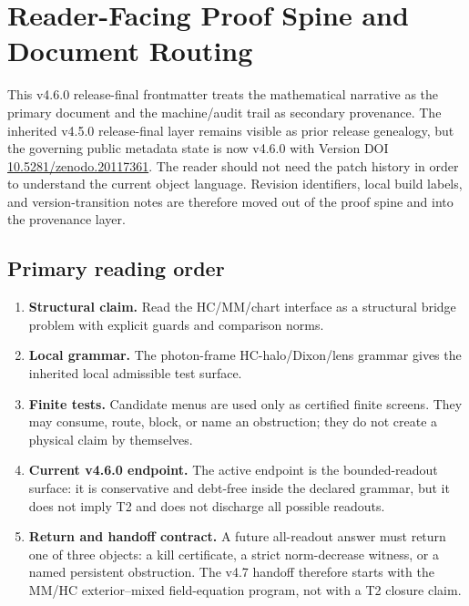 \clearpage
\section*{Reader-Facing Proof Spine and Document Routing}

This v4.6.0 release-final frontmatter treats the mathematical narrative as the primary document and the machine/audit trail as secondary provenance.  The inherited v4.5.0 release-final layer remains visible as prior release genealogy, but the governing public metadata state is now v4.6.0 with Version DOI \href{https://doi.org/10.5281/zenodo.20117361}{10.5281/zenodo.20117361}.  The reader should not need the patch history in order to understand the current object language.  Revision identifiers, local build labels, and version-transition notes are therefore moved out of the proof spine and into the provenance layer.

\subsection*{Primary reading order}

\begin{enumerate}[label=\arabic*.]
    \item \textbf{Structural claim.}  Read the HC/MM/chart interface as a structural bridge problem with explicit guards and comparison norms.
    \item \textbf{Local grammar.}  The photon-frame HC-halo/Dixon/lens grammar gives the inherited local admissible test surface.
    \item \textbf{Finite tests.}  Candidate menus are used only as certified finite screens.  They may consume, route, block, or name an obstruction; they do not create a physical claim by themselves.
    \item \textbf{Current v4.6.0 endpoint.}  The active endpoint is the bounded-readout surface: it is conservative and debt-free inside the declared grammar, but it does not imply T2 and does not discharge all possible readouts.
    \item \textbf{Return and handoff contract.}  A future all-readout answer must return one of three objects: a kill certificate, a strict norm-decrease witness, or a named persistent obstruction.  The v4.7 handoff therefore starts with the MM/HC exterior--mixed field-equation program, not with a T2 closure claim.
\end{enumerate}

